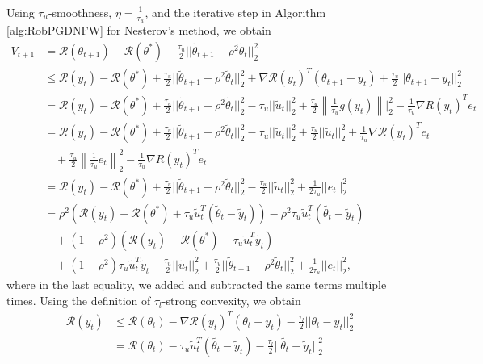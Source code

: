 \documentclass{article}
\begin{document}
Using $\tau_u$-smoothness, $\eta = \frac{1}{\tau_u}$, and the iterative step in Algorithm \ref{alg:RobPGDNFW} for Nesterov's method, we obtain
\begin{align*}
V_{t + 1} &= \mathcal{R}(\theta_{t + 1}) - \mathcal{R}(\theta^*) + \frac{\tau_u}{2}||\widetilde{\theta}_{t + 1} - \rho^2\widetilde{\theta}_t||_2^2\\
&\leq \mathcal{R}(y_t) - \mathcal{R}(\theta^*) + \frac{\tau_u}{2}||\widetilde{\theta}_{t + 1} - \rho^2\widetilde{\theta}_t||_2^2 + \nabla\mathcal{R}(y_t)^T(\theta_{t + 1} - y_t) + \frac{\tau_u}{2}||\theta_{t + 1} - y_t||_2^2\\
&= \mathcal{R}(y_t) - \mathcal{R}(\theta^*) + \frac{\tau_u}{2}||\widetilde{\theta}_{t + 1} - \rho^2\widetilde{\theta}_t||_2^2 - \tau_u||\widetilde{u}_t||_2^2 + \frac{\tau_u}{2}\left\|\frac{1}{\tau_u}g(y_t)\right\||_2^2 - \frac{1}{\tau_u}\nabla{R}(y_t)^Te_t\\
&= \mathcal{R}(y_t) - \mathcal{R}(\theta^*) + \frac{\tau_u}{2}||\widetilde{\theta}_{t + 1} - \rho^2\widetilde{\theta}_t||_2^2 - \tau_u||\widetilde{u}_t||_2^2 + \frac{\tau_u}{2}||\widetilde{u}_t||_2^2 + \frac{1}{\tau_u}\nabla\mathcal{R}(y_t)^Te_t\\
& \quad + \frac{\tau_u}{2}\left\|\frac{1}{\tau_u}e_t\right\|_2^2 - \frac{1}{\tau_u}\nabla{R}(y_t)^Te_t\\
&= \mathcal{R}(y_t) - \mathcal{R}(\theta^*) + \frac{\tau_u}{2}||\widetilde{\theta}_{t + 1} - \rho^2\widetilde{\theta}_t||_2^2 - \frac{\tau_u}{2}||\widetilde{u}_t||_2^2 + \frac{1}{2\tau_u}||e_t||_2^2\\
&= \rho^2(\mathcal{R}(y_t) - \mathcal{R}(\theta^*) + \tau_u\widetilde{u}_t^T(\widetilde{\theta}_t - \widetilde{y}_t)) - \rho^2\tau_u\widetilde{u}_t^T(\widetilde{\theta_t} - \widetilde{y}_t)\\
& \quad + (1 - \rho^2)(\mathcal{R}(y_t) - \mathcal{R}(\theta^*) - \tau_u\widetilde{u}_t^T\widetilde{y}_t)\\
& \quad + (1 - \rho^2)\tau_u\widetilde{u}_t^T\widetilde{y}_t -\frac{\tau_u}{2}||\widetilde{u}_t||_2^2 + \frac{\tau_u}{2}||\widetilde{\theta}_{t + 1} - \rho^2\widetilde{\theta}_t||_2^2 + \frac{1}{2\tau_u}||e_t||_2^2,
\end{align*}
where in the last equality, we added and subtracted the same terms multiple times. Using the definition of $\tau_l$-strong convexity, we obtain
\begin{align*}
\mathcal{R}(y_t) &\leq \mathcal{R}(\theta_t) - \nabla\mathcal{R}(y_t)^T(\theta_t - y_t) - \frac{\tau_l}{2}||\theta_t - y_t||_2^2\\
&= \mathcal{R}(\theta_t) - \tau_u\widetilde{u}_t^T(\widetilde{\theta_t} - \widetilde{y}_t) - \frac{\tau_l}{2}||\widetilde{\theta_t} - \widetilde{y}_t||_2^2
\end{align*}
\end{document}
